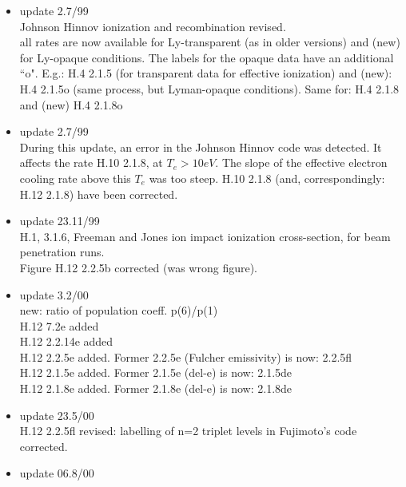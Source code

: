 \documentclass[12pt,dvips]{article}
\begin{document}
\begin{itemize}
               (only 2.3.9b,K10, differs from earlier version)\\
               H.4 2.3.9e, 2.3.9f 2.3.9g  redone \\
               (only 2.3.9f,K20, differs from earlier version)\\
               H.4 2.3.9h, 2.3.9i 2.3.9j  redone \\
               (only 2.3.9j,K30, differs from earlier version)\\
 \item update   2.7/99 \\
  Johnson Hinnov ionization and recombination revised.\\
  all rates are now available for Ly-transparent (as in older versions)
  and (new) for Ly-opaque conditions. The labels for the opaque
  data have an additional ``o". E.g.: H.4 2.1.5 (for transparent
  data for effective ionization) and (new): H.4 2.1.5o (same process,
  but Lyman-opaque conditions). Same for: H.4 2.1.8 and (new) H.4 2.1.8o
 \item update   2.7/99 \\
  During this update, an error in the Johnson Hinnov code was detected.
  It affects the rate H.10 2.1.8, at $T_e > 10 eV$. The slope of the
  effective electron cooling rate above this $T_e$ was too steep.
  H.10 2.1.8  (and, correspondingly: H.12 2.1.8) have been corrected.
 \item update   23.11/99 \\
  H.1, 3.1.6, Freeman and Jones ion impact ionization cross-section,
  for beam penetration runs.\\
  Figure H.12 2.2.5b corrected (was wrong figure).
 \item update   3.2/00 \\
  new: ratio of population coeff. p(6)/p(1)\\
  H.12 7.2e added                            \\
  H.12 2.2.14e added                          \\
  H.12 2.2.5e added. Former 2.2.5e (Fulcher emissivity) is now:
                            2.2.5fl\\
  H.12 2.1.5e added. Former 2.1.5e (del-e) is now: 2.1.5de \\
  H.12 2.1.8e added. Former 2.1.8e (del-e) is now: 2.1.8de
 \item update  23.5/00 \\
  H.12 2.2.5fl revised: labelling of n=2 triplet levels in Fujimoto's
  code corrected.
 \item update  06.8/00 \\

\end{itemize}
\end{document}
